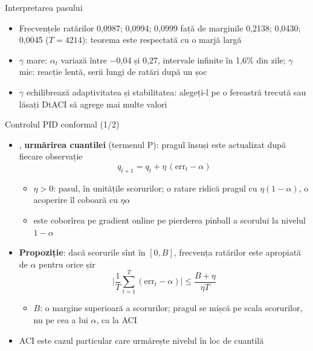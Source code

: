 \begin{frame}{Interpretarea pasului}
\itemsize{\small}
\begin{itemize}
    \item Frecvențele ratărilor 0{,}0987; 0{,}0994; 0{,}0999 față de marginile 0{,}2138; 0{,}0430; 0{,}0045 ($T = 4214$): teorema este respectată cu o marjă largă
    \item $\gamma$ mare: $\alpha_t$ variază între \ensuremath{-}0{,}04 și 0{,}27, intervale infinite în 1{,}6\% din zile; $\gamma$ mic: reacție lentă, serii lungi de ratări după un șoc
    \item $\gamma$ echilibrează adaptivitatea și stabilitatea: alegeți-l pe o fereastră trecută sau lăsați DtACI să agrege mai multe valori
\end{itemize}
\end{frame}

\begin{frame}{Controlul PID conformal (1/2)}
\itemsize{\small}
\begin{itemize}
    \item {}, \textbf{urmărirea cuantilei} (termenul P): pragul însuși este actualizat după fiecare observație \[ q_{t+1} = q_t + \eta\,(\mathrm{err}_t - \alpha) \]
    \begin{itemize}
        \item $\eta > 0$: pasul, în unitățile scorurilor; o ratare ridică pragul cu $\eta(1 - \alpha)$, o acoperire îl coboară cu $\eta\alpha$
        \item este coborîrea pe gradient online pe pierderea pinball a scorului la nivelul $1 - \alpha$
    \end{itemize}
    \item \textbf{Propoziție}: dacă scorurile sînt în $[0, B]$, frecvența ratărilor este apropiată de $\alpha$ pentru orice șir \[ \Big|\frac1T\sum_{t=1}^T(\mathrm{err}_t - \alpha)\Big| \le \frac{B + \eta}{\eta T} \]
    \begin{itemize}
        \item $B$: o margine superioară a scorurilor; pragul se mișcă pe scala scorurilor, nu pe cea a lui $\alpha$, ca la ACI
    \end{itemize}
    \item ACI este cazul particular care urmărește nivelul în loc de cuantilă
\end{itemize}
\end{frame}

